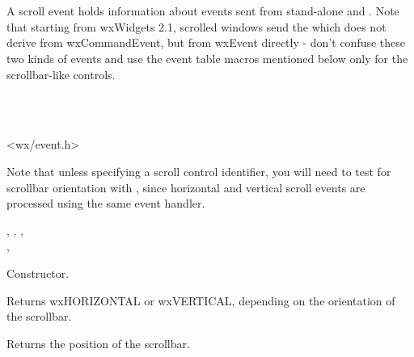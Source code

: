 \section{}\label{wxscrollevent}

A scroll event holds information about events sent from stand-alone
 and . Note that
starting from wxWidgets 2.1, scrolled windows send the 
 which does not derive from
wxCommandEvent, but from wxEvent directly - don't confuse these two kinds of
events and use the event table macros mentioned below only for the
scrollbar-like controls.


\\
\\


<wx/event.h>






Note that unless specifying a scroll control identifier, you will need to test for scrollbar
orientation with , since
horizontal and vertical scroll events are processed using the same event handler.


, , , \\
, 


\label{wxscrolleventctor}


Constructor.

\label{wxscrolleventgetorientation}


Returns wxHORIZONTAL or wxVERTICAL, depending on the orientation of the scrollbar.

\label{wxscrolleventgetposition}


Returns the position of the scrollbar.

